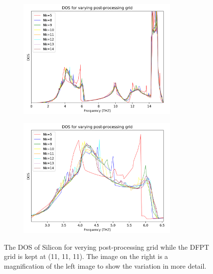 \documentclass[12pt]{article}
\begin{document}
\begin{figure}[!htpb]
	\centering
	\begin{subfigure}{0.5\textwidth}
	\centering
	\includegraphics[width=8cm]{../Figures/dos_pp_vary.png}
	\subcaption{}
	\label{fig:ppdoswhole}
	\end{subfigure}%
	\begin{subfigure}{0.5\textwidth}
	\centering
	\includegraphics[width=8cm]{../Figures/dos_pp_vary_zoom.png}
	\subcaption{}
	\label{fig:ppdoszoom}
\end{subfigure}%
\caption{The DOS of Silicon for verying post-processing grid while the DFPT grid is kept at (11, 11, 11). The image on the right is a magnification of the left image to show the variation in more detail.}
\label{fig:ppdos}
\end{figure}
\end{document}
